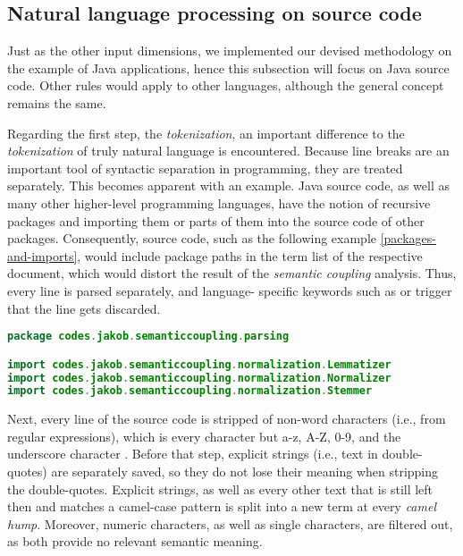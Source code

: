 \documentclass[12pt,a4paper]{report}
\begin{document}
\subsection{Natural language processing on source code}

Just as the other input dimensions, we implemented our devised methodology on
the example of Java applications, hence this subsection will focus on Java
source code. Other rules would apply to other languages, although the general
concept remains the same.

Regarding the first step, the \textit{tokenization}, an important difference to
the \textit{tokenization} of truly natural language is encountered. Because
line breaks are an important tool of syntactic separation in programming, they
are treated separately. This becomes apparent with an example. Java source
code, as well as many other higher-level programming languages, have the notion
of recursive packages and importing them or parts of them into the source code
of other packages. Consequently, source code, such as the following example
\ref{packages-and-imports}, would include package paths in the term list of the
respective document, which would distort the result of the \textit{semantic
coupling} analysis. Thus, every line is parsed separately, and language\hyp
specific keywords such as  or  trigger that the line
gets discarded.

\begin{lstlisting}[caption=Packages and imports in Java, label=packages-and-imports, language=Java, breaklines=true]
package codes.jakob.semanticcoupling.parsing

import codes.jakob.semanticcoupling.normalization.Lemmatizer
import codes.jakob.semanticcoupling.normalization.Normalizer
import codes.jakob.semanticcoupling.normalization.Stemmer
\end{lstlisting}

Next, every line of the source code is stripped of non\hyp word characters
(i.e.,  from regular expressions), which is every character but a-z,
A-Z, 0-9, and the underscore character \cite{ieee1992posix}. Before that step,
explicit strings (i.e., text in double-quotes) are separately saved, so they do
not lose their meaning when stripping the double-quotes.
Explicit strings, as well as every other text that is still left then and
matches a camel-case pattern is split into a new term at every \textit{camel
hump}. Moreover, numeric characters, as well as single characters, are filtered
out, as both provide no relevant semantic meaning.
\end{document}
